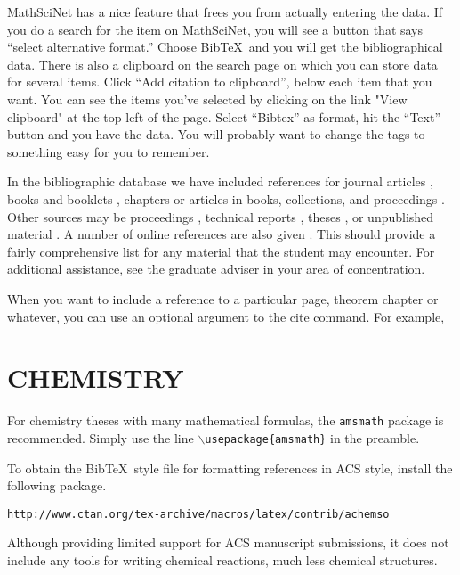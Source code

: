 MathSciNet has a nice feature that frees you from actually entering
the data. 
If you do a search for the item on MathSciNet, you will see a button
that says ``select alternative format.''  Choose {\sc Bib}\TeX\ and
you will get the bibliographical data.
There is also a clipboard on the  search page on which you can
store  data for several items.  Click ``Add citation to
clipboard'', below each item that you want.
You can see the items you've selected by clicking  on the link "View
clipboard" at the top left of  the page.
Select ``Bibtex'' as format, hit the ``Text'' button and you have the
data.  You will probably want to change the tags to something easy for
you to remember.

In the bibliographic database we have included  references for journal articles
\cite{ART}, books and booklets \cite{AM,BKL}, chapters or articles in
books, collections, and proceedings \cite{INB,INC,INP}. 
Other sources may be proceedings \cite{PRO},
technical reports \cite{TEC}, theses \cite{MTH}, or unpublished material
\cite{UNP}.  A number of online references are also given
\cite{uiuc_tutorial,indian_tutorial}.
This should provide a fairly comprehensive list for any
material that the student may encounter.  For additional assistance, see
the graduate adviser in your area of concentration.  

When you want to include a reference to a particular page, theorem
chapter or whatever, you can use an optional argument to the cite
command.  For example, \cite[Thm.~1.1]{AM}


\chapter{CHEMISTRY}
\label{c:chem}

For chemistry theses with many mathematical formulas, the 
{\tt   amsmath} package is  recommended. Simply use the line
{\tt $\backslash$usepackage\{amsmath\}} in the preamble.

To obtain the {\sc Bib}\TeX\ style file for formatting references in ACS style,
install the  following package.
\begin{description}
\item \verb+http://www.ctan.org/tex-archive/macros/latex/contrib/achemso+
\end{description}
Although providing limited support for ACS manuscript submissions,
it does not include any tools for writing chemical reactions, much less
chemical structures.

